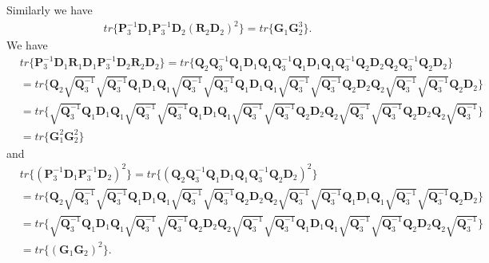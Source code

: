 \documentclass[12pt]{article}
\begin{document}
Similarly we have
\begin{align}  \label{eq:dif4_F1_d}
tr\{ \mathbf{P}_3^{-1} \mathbf{D}_1 \mathbf{P}_3^{-1} \mathbf{D}_2 (\mathbf{R}_2 \mathbf{D}_2)^2 \} = tr\{ \mathbf{G}_1 \mathbf{G}_2^3 \}.
\end{align}
We have
\begin{align}  \label{eq:dif4_F1_e}
& tr\{ \mathbf{P}_3^{-1} \mathbf{D}_1 \mathbf{R}_1 \mathbf{D}_1 \mathbf{P}_3^{-1} \mathbf{D}_2 \mathbf{R}_2 \mathbf{D}_2 \} = tr\{ \mathbf{Q}_2 \mathbf{Q}_3^{-1} \mathbf{Q}_1 \mathbf{D}_1 \mathbf{Q}_1 \mathbf{Q}_3^{-1} \mathbf{Q}_1 \mathbf{D}_1 \mathbf{Q}_1 \mathbf{Q}_3^{-1} \mathbf{Q}_2 \mathbf{D}_2 \mathbf{Q}_2 \mathbf{Q}_3^{-1} \mathbf{Q}_2 \mathbf{D}_2 \}  \nonumber \\
& = tr\{ \mathbf{Q}_2 \sqrt{\mathbf{Q}_3^{-1}} \sqrt{\mathbf{Q}_3^{-1}} \mathbf{Q}_1 \mathbf{D}_1 \mathbf{Q}_1 \sqrt{\mathbf{Q}_3^{-1}} \sqrt{\mathbf{Q}_3^{-1}} \mathbf{Q}_1 \mathbf{D}_1 \mathbf{Q}_1 \sqrt{\mathbf{Q}_3^{-1}} \sqrt{\mathbf{Q}_3^{-1}} \mathbf{Q}_2 \mathbf{D}_2 \mathbf{Q}_2 \sqrt{\mathbf{Q}_3^{-1}} \sqrt{\mathbf{Q}_3^{-1}} \mathbf{Q}_2 \mathbf{D}_2 \}  \nonumber \\
& = tr\{ \sqrt{\mathbf{Q}_3^{-1}} \mathbf{Q}_1 \mathbf{D}_1 \mathbf{Q}_1 \sqrt{\mathbf{Q}_3^{-1}} \sqrt{\mathbf{Q}_3^{-1}} \mathbf{Q}_1 \mathbf{D}_1 \mathbf{Q}_1 \sqrt{\mathbf{Q}_3^{-1}} \sqrt{\mathbf{Q}_3^{-1}} \mathbf{Q}_2 \mathbf{D}_2 \mathbf{Q}_2 \sqrt{\mathbf{Q}_3^{-1}} \sqrt{\mathbf{Q}_3^{-1}} \mathbf{Q}_2 \mathbf{D}_2 \mathbf{Q}_2 \sqrt{\mathbf{Q}_3^{-1}} \}  \nonumber \\
& = tr\{ \mathbf{G}_1^2 \mathbf{G}_2^2 \}
\end{align}
and
\begin{align}  \label{eq:dif4_F1_f}
& tr\{ (\mathbf{P}_3^{-1} \mathbf{D}_1 \mathbf{P}_3^{-1} \mathbf{D}_2)^2 \} = tr\{ (\mathbf{Q}_2 \mathbf{Q}_3^{-1} \mathbf{Q}_1 \mathbf{D}_1 \mathbf{Q}_1 \mathbf{Q}_3^{-1} \mathbf{Q}_2 \mathbf{D}_2)^2 \}  \nonumber \\
& = tr\{ \mathbf{Q}_2 \sqrt{\mathbf{Q}_3^{-1}} \sqrt{\mathbf{Q}_3^{-1}} \mathbf{Q}_1 \mathbf{D}_1 \mathbf{Q}_1 \sqrt{\mathbf{Q}_3^{-1}} \sqrt{\mathbf{Q}_3^{-1}} \mathbf{Q}_2 \mathbf{D}_2 \mathbf{Q}_2 \sqrt{\mathbf{Q}_3^{-1}} \sqrt{\mathbf{Q}_3^{-1}} \mathbf{Q}_1 \mathbf{D}_1 \mathbf{Q}_1 \sqrt{\mathbf{Q}_3^{-1}} \sqrt{\mathbf{Q}_3^{-1}} \mathbf{Q}_2 \mathbf{D}_2 \}  \nonumber \\
& = tr\{ \sqrt{\mathbf{Q}_3^{-1}} \mathbf{Q}_1 \mathbf{D}_1 \mathbf{Q}_1 \sqrt{\mathbf{Q}_3^{-1}} \sqrt{\mathbf{Q}_3^{-1}} \mathbf{Q}_2 \mathbf{D}_2 \mathbf{Q}_2 \sqrt{\mathbf{Q}_3^{-1}} \sqrt{\mathbf{Q}_3^{-1}} \mathbf{Q}_1 \mathbf{D}_1 \mathbf{Q}_1 \sqrt{\mathbf{Q}_3^{-1}} \sqrt{\mathbf{Q}_3^{-1}} \mathbf{Q}_2 \mathbf{D}_2 \mathbf{Q}_2 \sqrt{\mathbf{Q}_3^{-1}} \}  \nonumber \\
& = tr\{ (\mathbf{G}_1 \mathbf{G}_2)^2 \}.
\end{align}
\end{document}
